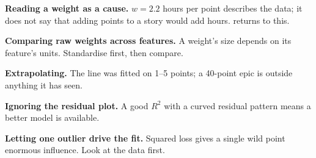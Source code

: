 \begin{pitfall}
\begin{tight}
  \item \textbf{Reading a weight as a cause.} $w = 2.2$ hours per point describes
        the data; it does not say that adding points to a story would add hours.
         returns to this.
  \item \textbf{Comparing raw weights across features.} A weight's size depends
        on its feature's units. Standardise first, then compare.
  \item \textbf{Extrapolating.} The line was fitted on 1--5 points; a 40-point
        epic is outside anything it has seen.
  \item \textbf{Ignoring the residual plot.} A good $R^2$ with a curved residual
        pattern means a better model is available.
  \item \textbf{Letting one outlier drive the fit.} Squared loss gives a single
        wild point enormous influence. Look at the data first.
\end{tight}
\end{pitfall}

